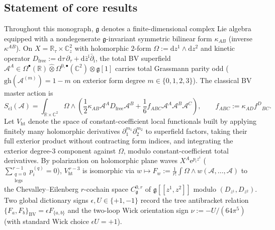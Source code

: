\documentclass[11pt,letterpaper]{article}
\numberwithin{equation}{section}
\theoremstyle{plain}
\theoremstyle{definition}
\theoremstyle{remark}
\newcommand{\dd}{\mathrm{d}}
\newcommand{\dbar}{\bar{\partial}}
\newcommand{\ee}{\mathrm{e}}
\newcommand{\fg}{\mathfrak{g}}
\newcommand{\Vht}{V_{\mathrm{ht}}}
\begin{document}
\subsection{Statement of core results}
\label{subsec:summary-results}

Throughout this monograph, $\fg$ denotes a finite-dimensional complex Lie algebra equipped with a nondegenerate $\fg$-invariant symmetric bilinear form $\kappa_{AB}$ (inverse $\kappa^{AB}$). On $X = \mathbb{R}_\tau \times \mathbb{C}^2_z$ with holomorphic $2$-form $\Omega := \dd z^1\wedge\dd z^2$ and kinetic operator $D_{\mathrm{free}} := \dd\tau\,\partial_\tau + \dd\bar{z}^{\bar{\imath}}\dbar_{\bar{\imath}}$, the total BV superfield $\mathcal{A}^A \in \Omega^\bullet(\mathbb{R})\widehat{\otimes}\Omega^{0,\bullet}(\mathbb{C}^2)\otimes\fg[1]$ carries total Grassmann parity odd ($\mathrm{gh}(\mathcal{A}^{(m)}) = 1 - m$ on exterior form degree $m \in \{0,1,2,3\}$). The classical BV master action is
\begin{equation}
\label{eq:summary-Scl}
S_{\mathrm{cl}}(\mathcal{A}) = \int_{\mathbb{R}\times\mathbb{C}^2}\Omega \wedge \left(\frac{1}{2}\kappa_{AB}\mathcal{A}^A D_{\mathrm{free}}\mathcal{A}^B + \frac{1}{6}f_{ABC}\mathcal{A}^A\mathcal{A}^B\mathcal{A}^C\right), \qquad f_{ABC} := \kappa_{AD}f^D{}_{BC}.
\end{equation}
Let $\Vht$ denote the space of constant-coefficient local functionals built by applying finitely many holomorphic derivatives $\partial_1^{m_1}\partial_2^{m_2}$ to superfield factors, taking their full exterior product without contracting form indices, and integrating the exterior degree-$3$ component against $\Omega$, modulo constant-coefficient total derivatives. By polarization on holomorphic plane waves $X^A\ee^{p_i z^i}$ ($\sum_{\substack{q=0\\\mathrm{legs}}}^{r-1} p^{(q)}_i = 0$), $\Vht^{\,r-3}$ is isomorphic via $w \mapsto F_w := \frac{1}{r!}\int\Omega\wedge w(\mathcal{A},\dots,\mathcal{A})$ to the Chevalley--Eilenberg $r$-cochain space $C^{0,r}_{\fg}$ of $\fg[[z^1,z^2]]$ modulo $(D_{z^1}, D_{z^2})$. Two global dictionary signs $\epsilon, U \in \{+1,-1\}$ record the tree antibracket relation $\{F_a, F_b\}_{\mathrm{BV}} = \epsilon F_{\{a,b\}}$ and the two-loop Wick orientation sign $\nu := -U/(64\pi^5)$ (with standard Wick choice $\epsilon U = +1$).
\end{document}
